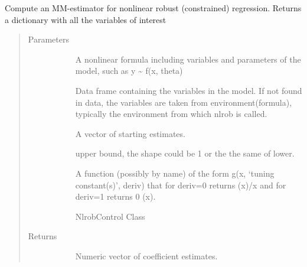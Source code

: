 \documentclass[letterpaper,10pt,english]{sphinxmanual}
\begin{document}
\begin{fulllineitems}
\label{\detokenize{_modules/nlrob:nlrob.nlrob_MM}}
Compute an MM-estimator for nonlinear robust (constrained) regression.
Returns a dictionary with all the variables of interest
\begin{quote}\begin{description}
\item[{Parameters}] \leavevmode\begin{description}
\item[{}] \leavevmode
A nonlinear formula including variables and parameters of the model,
such as y \textasciitilde{} f(x, theta)

\item[{}] \leavevmode
Data frame containing the variables in the model. If not found in
data, the variables are taken from environment(formula), typically
the environment from which nlrob is called.

\item[{}] \leavevmode
A vector of starting estimates.

\item[{}] \leavevmode
upper bound, the shape could be 1 or the the same of lower.

\item[{}] \leavevmode
A function (possibly by name) of the form g(x, ‘tuning constant(s)’,
deriv)
that for deriv=0 returns (x)/x and for deriv=1 returns  0 (x).

\item[{}] \leavevmode
\item[{}] \leavevmode
NlrobControl Class

\end{description}

\item[{Returns}] \leavevmode\begin{description}
\item[{}] \leavevmode
Numeric vector of coefficient estimates.


\end{description}
\end{description}
\end{quote}
\end{fulllineitems}
\end{document}
